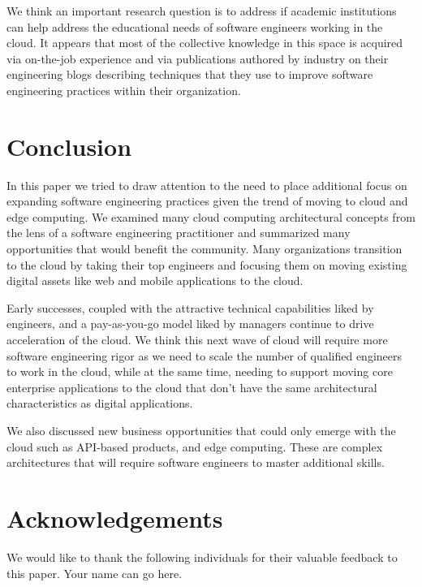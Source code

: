 \documentclass[conference]{IEEEconf}
\begin{document}
We think an important research question is to address if academic institutions can help address the educational needs of software engineers working in the cloud.  It appears that most of the collective knowledge in this space is acquired via on-the-job experience and via publications authored by industry on their engineering blogs describing techniques that they use to improve software engineering practices within their organization.  

\section{Conclusion}
In this paper we tried to draw attention to the need to place additional focus on expanding software engineering practices given the trend of moving to cloud and edge computing.  We examined many cloud computing architectural concepts from the lens of a software engineering practitioner and summarized many opportunities that would benefit the community. Many organizations transition to the cloud by taking their top engineers and focusing them on moving existing digital assets like web and mobile applications to the cloud.

Early successes, coupled with the attractive technical capabilities liked by engineers, and a pay-as-you-go model liked by managers continue to drive acceleration of the cloud.  We think this next wave of cloud will require more software engineering rigor as we need to scale the number of qualified engineers to work in the cloud, while at the same time, needing to support moving core enterprise applications to the cloud that don't have the same architectural characteristics as digital applications. 

We also discussed new business opportunities that could only emerge with the cloud such as API-based products, and edge computing.  These are complex architectures that will require software engineers to master additional skills.

\section{Acknowledgements}
We would like to thank the following individuals for their valuable feedback to this paper. Your name can go here. 


\end{document}
